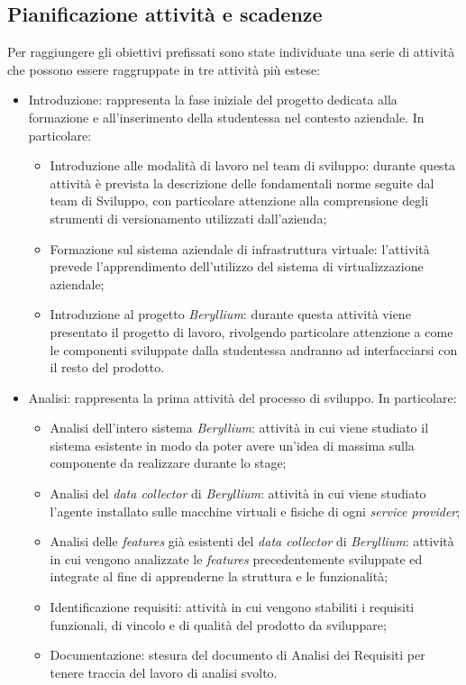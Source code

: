 \subsection{Pianificazione attività e scadenze}
Per raggiungere gli obiettivi prefissati sono state individuate una serie di attività che possono essere raggruppate in tre attività più estese:
\begin{itemize}
    \item Introduzione: rappresenta la fase iniziale del progetto dedicata alla formazione e all'inserimento della studentessa nel contesto aziendale. In particolare:
        \begin{itemize}
            \item Introduzione alle modalità di lavoro nel team di sviluppo: durante questa attività è prevista la descrizione delle fondamentali norme seguite dal team di Sviluppo, con particolare attenzione alla comprensione degli strumenti di versionamento utilizzati dall'azienda;
            \item Formazione sul sistema aziendale di infrastruttura virtuale: l'attività prevede l'apprendimento dell’utilizzo del sistema di virtualizzazione aziendale;
            \item Introduzione al progetto \emph{Beryllium}: durante questa attività viene presentato il progetto di lavoro, rivolgendo particolare attenzione a come le componenti sviluppate dalla studentessa andranno ad interfacciarsi con il resto del prodotto.
        \end{itemize}
    \item Analisi: rappresenta la prima attività del processo di sviluppo.
    In particolare:
        \begin{itemize}
            \item Analisi dell’intero sistema \emph{Beryllium}: attività in cui viene studiato il sistema esistente in modo da poter avere un’idea di massima sulla componente da realizzare durante lo stage;
            \item Analisi del \emph{data collector} di \emph{Beryllium}: attività in cui viene studiato l'agente installato sulle macchine virtuali e fisiche di ogni \emph{service provider};
            \item Analisi delle \emph{features} già esistenti del \emph{data collector} di \emph{Beryllium}: attività in cui vengono analizzate le \emph{features} precedentemente sviluppate ed integrate al fine di apprenderne la struttura e le funzionalità; 
            \item Identificazione requisiti: attività in cui vengono stabiliti i requisiti funzionali, di vincolo e di qualità del prodotto da sviluppare;
            \item Documentazione: stesura del documento di Analisi dei Requisiti per tenere traccia del lavoro di analisi svolto.
        \end{itemize}


\end{itemize}
